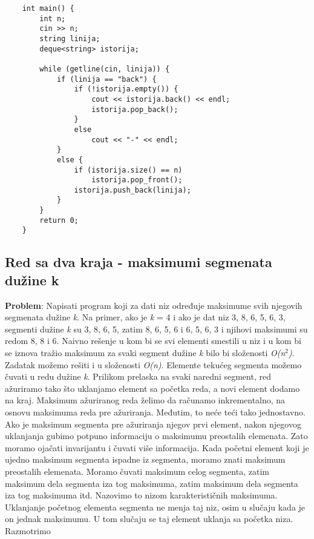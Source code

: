 \documentclass{article}
\begin{document}
\begin{lstlisting}
    int main() {
        int n;
        cin >> n;
        string linija;
        deque<string> istorija;
        
        while (getline(cin, linija)) {
            if (linija == "back") {
                if (!istorija.empty()) {
                    cout << istorija.back() << endl;
                    istorija.pop_back();
                } 
                else
                    cout << "-" << endl;
            } 
            else {
                if (istorija.size() == n)
                    istorija.pop_front();
                istorija.push_back(linija);
            }
        }
        return 0;
    }
\end{lstlisting}

\subsection{Red sa dva kraja - maksimumi segmenata dužine k}
\textbf{Problem}: Napisati program koji za dati niz određuje maksimume svih njegovih segmenata dužine \textit{k}. 
Na primer, ako je \textit{k} = 4 i ako je dat niz 3, 8, 6, 5, 6, 3, segmenti dužine \textit{k} su 3, 8, 6, 5, zatim 8, 6, 5, 6 i 6, 5, 6, 3 i njihovi maksimumi su redom 8, 8 i 6.
\newline Naivno rešenje u kom bi se svi elementi smestili u niz i u kom bi se iznova tražio maksimum za svaki segment dužine \textit{k} bilo bi složenosti \textit{O(n$^2$)}.
\newline Zadatak možemo rešiti i u složenosti \textit{O(n)}. Elemente tekućeg segmenta možemo čuvati u redu dužine \textit{k}. Prilikom prelaska na svaki naredni
segment, red ažuriramo tako što uklanjamo element sa početka reda, a novi element dodamo na kraj. Maksimum ažuriranog reda želimo da računamo 
inkrementalno, na osnovu maksimuma reda pre ažuriranja. Međutim, to neće teći tako jednostavno. Ako je maksimum
segmenta pre ažuriranja njegov prvi element, nakon njegovog uklanjanja gubimo
potpuno informaciju o maksimumu preostalih elemenata. Zato moramo ojačati
invarijantu i čuvati više informacija. Kada početni element koji je ujedno
maksimum segmenta ispadne iz segmenta, moramo znati maksimum preostalih
elemenata. Moramo čuvati maksimum celog segmenta, zatim maksimum
dela segmenta iza tog maksimuma, zatim maksimum dela segmenta iza tog
maksimuma itd. Nazovimo to nizom karakterističnih maksimuma. Uklanjanje početnog elementa segmenta ne menja taj niz, osim u slučaju kada je on jednak
maksimumu. U tom slučaju se taj element uklanja sa početka niza. Razmotrimo
\end{document}
